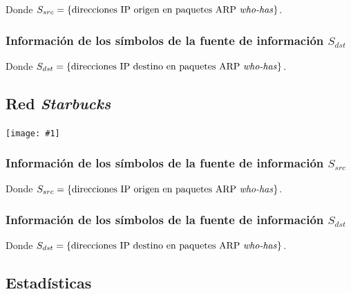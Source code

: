 \documentclass[a4paper, 10pt, twoside]{article}
\newcommand{\grafo}[1]{
  \texttt{[image: \#1]}
}
\begin{document}
Donde $S_{src} = \{ \text{direcciones IP origen en paquetes ARP \textit{who-has}} \}$.


\vspace{2cm}


\subsubsection{Información de los símbolos de la fuente de información $S_{dst}$}

Donde $S_{dst} = \{ \text{direcciones IP destino en paquetes ARP \textit{who-has}} \}$.


\vspace{2cm}




\subsection{Red \emph{Starbucks}}

\grafo{starbucks}


\subsubsection{Información de los símbolos de la fuente de información $S_{src}$}

Donde $S_{src} = \{ \text{direcciones IP origen en paquetes ARP \textit{who-has}} \}$.


\vspace{2cm}


\subsubsection{Información de los símbolos de la fuente de información $S_{dst}$}

Donde $S_{dst} = \{ \text{direcciones IP destino en paquetes ARP \textit{who-has}} \}$.


\vspace{2cm}







\subsection{Estadísticas}
\end{document}
